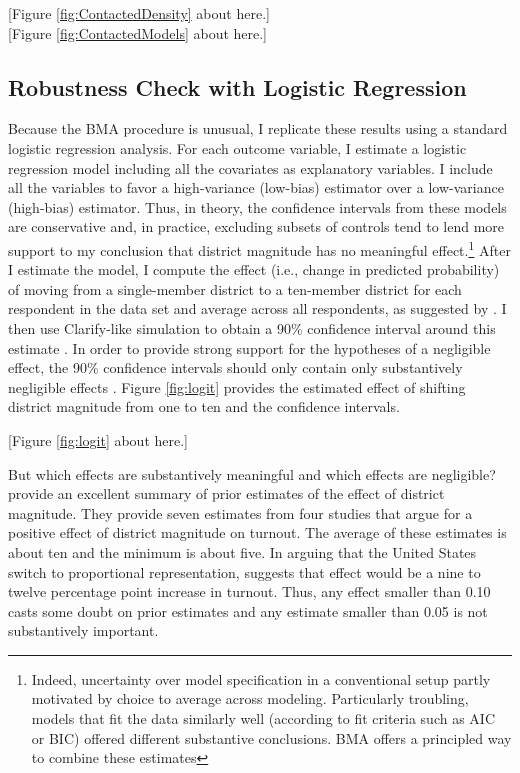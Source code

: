 \documentclass[12pt]{article}
\begin{document}
\begin{center}
[Figure \ref{fig:ContactedDensity} about here.]\\

[Figure \ref{fig:ContactedModels} about here.]
\end{center}

\subsection*{Robustness Check with Logistic Regression}

Because the BMA procedure is unusual, I replicate these results using a standard logistic regression analysis. For each outcome variable, I estimate a logistic regression model including all the covariates as explanatory variables. I include all the variables to favor a high-variance (low-bias) estimator over a low-variance (high-bias) estimator. Thus, in theory, the confidence intervals from these models are conservative and, in practice, excluding subsets of controls tend to lend more support to my conclusion that district magnitude has no meaningful effect.\footnote{Indeed, uncertainty over model specification in a conventional setup partly motivated by choice to average across modeling. Particularly troubling, models that fit the data similarly well (according to fit criteria such as AIC or BIC) offered different substantive conclusions. BMA offers a principled way to combine these estimates} After I estimate the model, I compute the effect (i.e., change in predicted probability) of moving from a single-member district to a ten-member district for each respondent in the data set and average across all respondents, as suggested by \cite{HanmerKalkan2013}. I then use Clarify-like simulation to obtain a 90\% confidence interval around this estimate \citep{KingTomzWittenberg2000}. In order to provide strong support for the hypotheses of a negligible effect, the 90\% confidence intervals should only contain only substantively negligible effects \citep{Rainey2014}. Figure \ref{fig:logit} provides the estimated effect of shifting district magnitude from one to ten and the confidence intervals. 

\begin{center}
[Figure \ref{fig:logit} about here.]\\
\end{center}

But which effects are substantively meaningful and which effects are negligible? \cite{BlaisAarts2006} provide an excellent summary of prior estimates of the effect of district magnitude. They provide seven estimates from four studies that argue for a positive effect of district magnitude on turnout. The average of these estimates is about ten and the minimum is about five. In arguing that the United States switch to proportional representation, \cite{Lijphart1997} suggests that effect would be a nine to twelve percentage point increase in turnout. Thus, any effect smaller than 0.10 casts some doubt on prior estimates and any estimate smaller than 0.05 is not substantively important.
\end{document}
